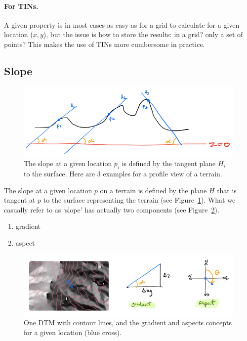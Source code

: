 \paragraph{For TINs.}
A given property is in most cases as easy as for a grid to calculate for a given location ($x,y$), but the issue is how to store the results: in a grid? only a set of points?
This makes the use of TINs more cumbersome in practice.



%
\subsection{Slope}%

\begin{figure}
  \centering
  \includegraphics[width=\linewidth]{figs/slope_concept}
  \caption{The slope at a given location $p_i$ is defined by the tangent plane $H_i$ to the surface. Here are 3 examples for a profile view of a terrain.}%
\label{fig:slope_concept}
\end{figure}

The slope at a given location $p$ on a terrain is defined by the plane $H$ that is tangent at $p$ to the surface representing the terrain (see Figure~\ref{fig:slope_concept}).
What we casually refer to as `slope' has actually two components (see Figure~\ref{fig:slope_aspect}).%
\begin{enumerate}
  \item gradient 
  \item aspect 
\end{enumerate}
\begin{figure}
  \centering
  \includegraphics[width=\linewidth]{figs/slope_aspect}
  \caption{One DTM with contour lines, and the gradient and aspects concepts for a given location (blue cross).}%
\label{fig:slope_aspect}
\end{figure}


